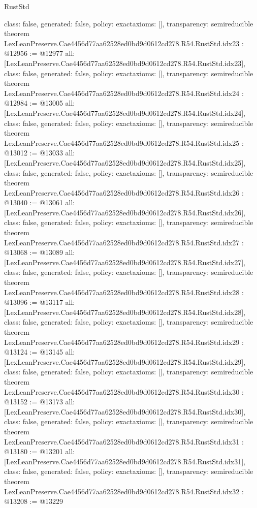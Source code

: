 \begin{lexlean}{RustStd}
\begin{coremodule}
{  class: false,
  generated: false,
  policy: exact{axioms: []},
  transparency: semireducible
}
theorem LexLeanPreserve.Cae4456d77aa62528ed0bd9d0612cd278.R54.RustStd.idx23 : @12956 := @12977 {
  all: [LexLeanPreserve.Cae4456d77aa62528ed0bd9d0612cd278.R54.RustStd.idx23],
  class: false,
  generated: false,
  policy: exact{axioms: []},
  transparency: semireducible
}
theorem LexLeanPreserve.Cae4456d77aa62528ed0bd9d0612cd278.R54.RustStd.idx24 : @12984 := @13005 {
  all: [LexLeanPreserve.Cae4456d77aa62528ed0bd9d0612cd278.R54.RustStd.idx24],
  class: false,
  generated: false,
  policy: exact{axioms: []},
  transparency: semireducible
}
theorem LexLeanPreserve.Cae4456d77aa62528ed0bd9d0612cd278.R54.RustStd.idx25 : @13012 := @13033 {
  all: [LexLeanPreserve.Cae4456d77aa62528ed0bd9d0612cd278.R54.RustStd.idx25],
  class: false,
  generated: false,
  policy: exact{axioms: []},
  transparency: semireducible
}
theorem LexLeanPreserve.Cae4456d77aa62528ed0bd9d0612cd278.R54.RustStd.idx26 : @13040 := @13061 {
  all: [LexLeanPreserve.Cae4456d77aa62528ed0bd9d0612cd278.R54.RustStd.idx26],
  class: false,
  generated: false,
  policy: exact{axioms: []},
  transparency: semireducible
}
theorem LexLeanPreserve.Cae4456d77aa62528ed0bd9d0612cd278.R54.RustStd.idx27 : @13068 := @13089 {
  all: [LexLeanPreserve.Cae4456d77aa62528ed0bd9d0612cd278.R54.RustStd.idx27],
  class: false,
  generated: false,
  policy: exact{axioms: []},
  transparency: semireducible
}
theorem LexLeanPreserve.Cae4456d77aa62528ed0bd9d0612cd278.R54.RustStd.idx28 : @13096 := @13117 {
  all: [LexLeanPreserve.Cae4456d77aa62528ed0bd9d0612cd278.R54.RustStd.idx28],
  class: false,
  generated: false,
  policy: exact{axioms: []},
  transparency: semireducible
}
theorem LexLeanPreserve.Cae4456d77aa62528ed0bd9d0612cd278.R54.RustStd.idx29 : @13124 := @13145 {
  all: [LexLeanPreserve.Cae4456d77aa62528ed0bd9d0612cd278.R54.RustStd.idx29],
  class: false,
  generated: false,
  policy: exact{axioms: []},
  transparency: semireducible
}
theorem LexLeanPreserve.Cae4456d77aa62528ed0bd9d0612cd278.R54.RustStd.idx30 : @13152 := @13173 {
  all: [LexLeanPreserve.Cae4456d77aa62528ed0bd9d0612cd278.R54.RustStd.idx30],
  class: false,
  generated: false,
  policy: exact{axioms: []},
  transparency: semireducible
}
theorem LexLeanPreserve.Cae4456d77aa62528ed0bd9d0612cd278.R54.RustStd.idx31 : @13180 := @13201 {
  all: [LexLeanPreserve.Cae4456d77aa62528ed0bd9d0612cd278.R54.RustStd.idx31],
  class: false,
  generated: false,
  policy: exact{axioms: []},
  transparency: semireducible
}
theorem LexLeanPreserve.Cae4456d77aa62528ed0bd9d0612cd278.R54.RustStd.idx32 : @13208 := @13229 {
}
\end{coremodule}
\end{lexlean}
